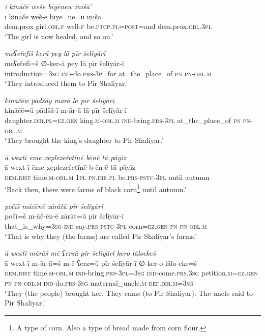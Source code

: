 \ea \label{ZP.91}
\textit{ī kināčē weše bīyēnew īnīšā’} \\ 
\gll ī kināčē weš-e bīyē=ne=ū īnīšā \\ 
 dem.prox girl\textsc{.obl}\textsc{.f} well\textsc{-f} be\textsc{.ptcp}\textsc{.pl}\textsc{=\textsc{post}}=and dem.prox\textsc{.obl}\textsc{.3pl} \\ 
\glt `The girl is now healed, and so on.'
\z 
 
\ea \label{ZP.92}
\textit{meʕeřefīš kerā pey lā pīr šelīyārī} \\ 
\gll meʕeřefī=š ∅-ker-ā pey lā pīr šelīyār-ī \\ 
 introduction\textsc{=3sg} \textsc{ind-}do\textsc{.prs}\textsc{-3pl} for at\_the\_place\_of \textsc{pn} \textsc{pn}\textsc{-obl}\textsc{.m} \\ 
\glt `They introduced them to Pir Shaliyar.'
\z 
 
\ea \label{ZP.93}
\textit{kināčēw pādšāy mārā lā pīr šelīyārī} \\ 
\gll kināčē=ū pādšā-ī m-ār-ā lā pīr šelīyār-ī \\ 
 daughter\textsc{.dir}\textsc{.pl}\textsc{\textsc{=ez.gen}} king\textsc{.m}\textsc{-obl}\textsc{.m} \textsc{ind-}bring\textsc{.prs}\textsc{-3pl} at\_the\_place\_of \textsc{pn} \textsc{pn}\textsc{-obl}\textsc{.m} \\ 
\glt `They brought the king’s daughter to Pir Shaliyar.'
\z 
 
\ea \label{ZP.94}
\textit{ā wextī ēme xeplezeřetīnē bēnē tā pāyīz} \\ 
\gll ā wext-ī ēme xeplezeřetīnē b-ēn-ē tā pāyīz \\ 
 \textsc{dem.dist} time\textsc{.m}\textsc{-obl}\textsc{.m} \textsc{1pl} \textsc{pn}\textsc{.dir}\textsc{.pl} be\textsc{.prs}\textsc{-pstc}\textsc{-3pl} until autumn \\ 
\glt `Back then, there were farms of black corn\footnote{A type of corn. Also a type of bread made from corn flour.} until autumn.'
\z 
 
\ea \label{ZP.96}
\textit{počīš māčēnē zārātū pīr šelīyārī} \\ 
\gll počī=š m-āč-ēn-ē zārāt=ū pīr šelīyār-ī \\ 
 that\_is\_why\textsc{=3sg} \textsc{ind-}say\textsc{.prs}\textsc{-pstc}\textsc{-3pl} corn\textsc{\textsc{=ez.gen}} \textsc{pn} \textsc{pn}\textsc{-obl}\textsc{.m} \\ 
\glt `That is why they (the farms) are called Pir Shaliyar’s farms.'
\z 
 
\ea \label{ZP.97}
\textit{ā wextī mārāš mē ʕerzū pīr šelīyārī kero lāloekeš} \\ 
\gll ā wext-ī m-ār-ā=š m-ē ʕerz=ū pīr šelīyār-ī ∅-ker-o lālo-eke=š \\ 
 \textsc{dem.dist} time\textsc{.m}\textsc{-obl}\textsc{.m} \textsc{ind-}bring\textsc{.prs}\textsc{-3pl}\textsc{=3sg} \textsc{ind-}come\textsc{.prs}\textsc{.3sg} petition\textsc{.m}\textsc{\textsc{=ez.gen}} \textsc{pn} \textsc{pn}\textsc{-obl}\textsc{.m} \textsc{ind-}do\textsc{.prs}\textsc{-3sg} maternal\_uncle\textsc{.m}\textsc{-def}\textsc{.dir}\textsc{.m}\textsc{=3sg} \\ 
\glt `They (the people) brought her. They came (to Pir Shaliyar). The uncle said to Pir Shaliyar,'
\z 
 
